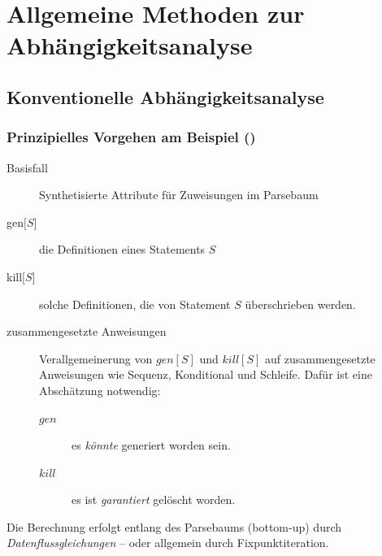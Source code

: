 
\section{Allgemeine Methoden zur Abhängigkeitsanalyse}
\subsection{Konventionelle Abhängigkeitsanalyse} %
\label{sec:konventionelle_abhaengigkeitsanalyse}

\subsubsection{Prinzipielles Vorgehen am Beispiel ()}
\label{ssub:prinzipielles_vorgehen_am_beispiel}

\begin{description}
\item[Basisfall] Synthetisierte Attribute für Zuweisungen im Parsebaum
\item[gen$\lbrack S \rbrack$] die Definitionen eines Statements $S$
\item[kill$\lbrack S \rbrack$] solche Definitionen, die von Statement $S$ überschrieben werden.
\item[zusammengesetzte Anweisungen] Verallgemeinerung von $gen[S]$ und $kill[S]$ auf zusammengesetzte Anweisungen wie Sequenz, Konditional und Schleife.
  Dafür ist eine Abschätzung notwendig:
  \begin{description}
    \item[$gen$] es \emph{könnte} generiert worden sein.
    \item[$kill$] es ist \emph{garantiert} gelöscht worden.
  \end{description}
\end{description}

Die Berechnung erfolgt entlang des Parsebaums (bottom-up) durch \emph{Datenflussgleichungen} -- oder allgemein durch Fixpunktiteration.

